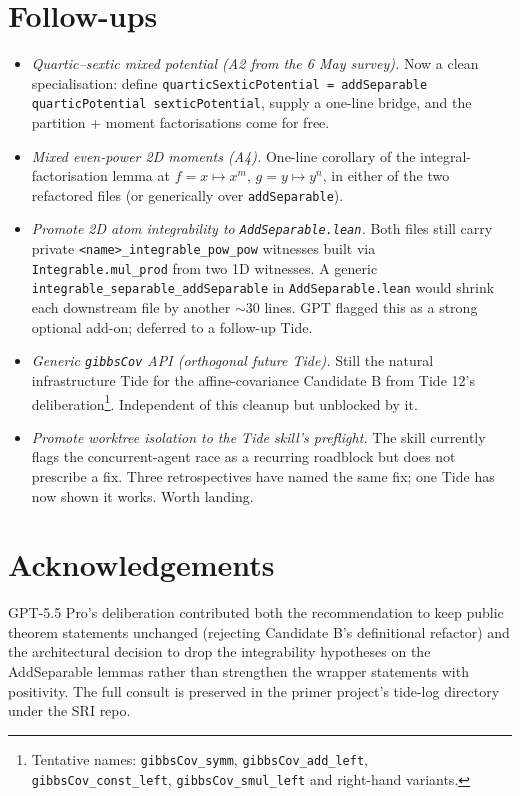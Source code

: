 \documentclass[11pt]{article}
\begin{document}
\section{Follow-ups}

\begin{itemize}
\item \emph{Quartic--sextic mixed potential (A2 from the 6 May
survey).} Now a clean specialisation: define
\texttt{quarticSexticPotential = addSeparable quarticPotential
sexticPotential}, supply a one-line bridge, and the partition + moment
factorisations come for free.

\item \emph{Mixed even-power 2D moments (A4).} One-line corollary of
the integral-factorisation lemma at $f = x \mapsto x^m,\, g = y
\mapsto y^n$, in either of the two refactored files (or generically
over \texttt{addSeparable}).

\item \emph{Promote 2D atom integrability to \texttt{AddSeparable.lean}.}
Both files still carry private \texttt{<name>\_integrable\_pow\_pow}
witnesses built via \texttt{Integrable.mul\_prod} from two 1D
witnesses. A generic
\texttt{integrable\_separable\_addSeparable} in
\texttt{AddSeparable.lean} would shrink each downstream file by
another $\sim$30 lines. GPT flagged this as a strong optional add-on;
deferred to a follow-up Tide.

\item \emph{Generic \texttt{gibbsCov} API (orthogonal future Tide).}
Still the natural infrastructure Tide for the affine-covariance
Candidate B from Tide 12's deliberation\footnote{Tentative names:
\texttt{gibbsCov\_symm}, \texttt{gibbsCov\_add\_left},
\texttt{gibbsCov\_const\_left}, \texttt{gibbsCov\_smul\_left} and
right-hand variants.}. Independent of this cleanup but unblocked by it.

\item \emph{Promote worktree isolation to the Tide skill's preflight.}
The skill currently flags the concurrent-agent race as a recurring
roadblock but does not prescribe a fix. Three retrospectives have
named the same fix; one Tide has now shown it works. Worth landing.
\end{itemize}

\section*{Acknowledgements}

GPT-5.5 Pro's deliberation contributed both the recommendation to
keep public theorem statements unchanged (rejecting Candidate B's
definitional refactor) and the architectural decision to drop the
integrability hypotheses on the AddSeparable lemmas rather than
strengthen the wrapper statements with positivity. The full consult is
preserved in the primer project's tide-log directory under the SRI
repo.
\end{document}
